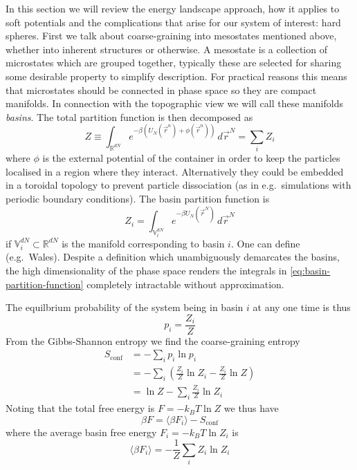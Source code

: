 \documentclass[11pt,twoside]{report}
\begin{document}
In this section we will review the energy landscape approach, how it applies to soft potentials and the complications that arise for our system of interest: hard spheres.
First we talk about coarse-graining into mesostates mentioned above, whether into inherent structures or otherwise.
A mesostate is a collection of microstates which are grouped together, typically these are selected for sharing some desirable property to simplify description.
For practical reasons this means that microstates should be connected in phase space so they are compact manifolds.
In connection with the topographic view we will call these manifolds \emph{basins}.
The total partition function is then decomposed as
\begin{equation}
  Z \equiv \int_{\mathbb{R}^{dN}} e^{-\beta (U_N(\vec{r}^n) + \phi(\vec{r}^n))} \, d\vec{r}^N = \sum_i Z_i
\end{equation}
where $\phi$ is the external potential of the container in order to keep the particles localised in a region where they interact.
Alternatively they could be embedded in a toroidal topology to prevent particle dissociation (as in e.g.\ simulations with periodic boundary conditions).
The basin partition function is
\begin{equation}
  Z_i = \int_{\mathbb{V}_i^{dN}} e^{-\beta U_N(\vec{r}^N)} \, d\vec{r}^N
\end{equation}
if $\mathbb{V}_i^{dN} \subset \mathbb{R}^{dN}$ is the manifold corresponding to basin $i$.
One can define (e.g.\ Wales).
Despite a definition which unambiguously demarcates the basins, the high dimensionality of the phase space renders the integrals in \eqref{eq:basin-partition-function} completely intractable without approximation.

The equilbrium probability of the system being in basin $i$ at any one time is thus
\begin{equation}
  p_i = \frac{Z_i}{Z}
\end{equation}
From the Gibbs-Shannon entropy we find the coarse-graining entropy
\begin{equation}
  \begin{split}
    S_{\textrm{conf}}
    &= -\sum_i p_i \ln{p_i} \\
    &= -\sum_i \left( \frac{Z_i}{Z} \ln{Z_i} - \frac{Z_i}{Z} \ln{Z} \right) \\
    &= \ln{Z} - \sum_i \frac{Z_i}{Z} \ln{Z_i}
  \end{split}
\end{equation}
Noting that the total free energy is $F = -k_B T \ln{Z}$ we thus have
\begin{equation}
  \beta F = \langle \beta F_i \rangle - S_{\textrm{conf}}
\end{equation}
where the average basin free energy $F_i = -k_B T \ln{Z_i}$ is
\begin{equation}
  \langle \beta F_i \rangle = - \frac{1}{Z} \sum_i Z_i \ln{Z_i}
\end{equation}
\end{document}
